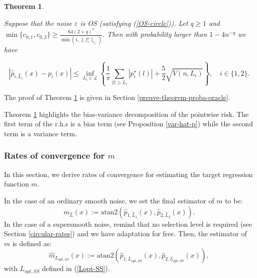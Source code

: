 \documentclass[11pt,a4paper,openany]{article}
\newtheorem{thm}{Theorem}[section]
\newcommand{\Atan}{\mbox{atan2}}
\begin{document}
\begin{thm}\label{theorem-proba-oracle}

Suppose that the noise $\varepsilon$ is OS (satisfying (\ref{OS-circle})).  Let $q\geq 1$ and 
$
\min \{c_{0, 1}, c_{0,2}\} \geq \frac{64(2 +q)^2 }{\min(1, \| f_{\varepsilon}^\star\|_{\ell_1})}.
$
Then with probability larger than $1-4n^{-q}$ we have 

\begin{equation} \label{proba-oracle}
| \widehat p_{i, \hat L_i} (x) -p_i(x)| \leq \inf_{L_i \in \mathcal L} \left \{ \frac{1}{ \pi}  \sum_{|l| \geq L_i} |p_i^\star(l)| + \frac 5 2 \sqrt{V(n,L_i) } \right \}, \quad i \in \{1, 2\}.
\end{equation}

\end{thm}

The proof of Theorem \ref{theorem-proba-oracle} is given in Section \ref{preuve-theorem-proba-oracle}.

Theorem \ref{theorem-proba-oracle} highlights the bias-variance decomposition of the pointwise risk. The first term  of the r.h.s is a bias term (see Proposition \ref{var-hat-p}) while the second term is a variance term.

\subsubsection{Rates of convergence for  $m$}
In this section, we derive rates of convergence for estimating the target regression function $m$.

\medskip

\noindent In the case of an ordinary smooth noise, we set the final estimator of $m$ to be:
\begin{equation}\label{estimator-m-circular}
\widehat m_{\hat L}(x) := \Atan(\widehat p_{1, \hat L_1}(x), \widehat p_{2, \hat L_2}(x)).
\end{equation}
\noindent In the case of a supersmooth  noise, remind that no selection level is required (see  Section \ref{circular-rates}) and we have adaptation for free. %
Then, the estimator of $m$ is defined as:
$$
\widehat m_{L_{opt,SS}}(x) := \Atan(\widehat p_{1, L_{opt, SS} }(x), \widehat p_{2, L_{{opt, SS}} }(x)),
$$ 
with $L_{{opt, SS}}$ defined in (\ref{Lopt-SS}).
\medskip
\end{document}
